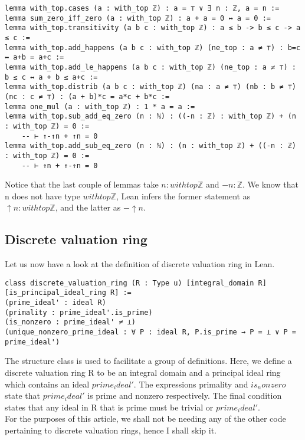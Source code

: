 \documentclass[10pt, a4paper]{article}
\begin{document}
\begin{lstlisting}
lemma with_top.cases (a : with_top ℤ) : a = ⊤ ∨ ∃ n : ℤ, a = n :=
lemma sum_zero_iff_zero (a : with_top ℤ) : a + a = 0 ↔ a = 0 :=
lemma with_top.transitivity (a b c : with_top ℤ) : a ≤ b -> b ≤ c -> a ≤ c :=
lemma with_top.add_happens (a b c : with_top ℤ) (ne_top : a ≠ ⊤) : b=c ↔ a+b = a+c :=
lemma with_top.add_le_happens (a b c : with_top ℤ) (ne_top : a ≠ ⊤) : b ≤ c ↔ a + b ≤ a+c :=
lemma with_top.distrib (a b c : with_top ℤ) (na : a ≠ ⊤) (nb : b ≠ ⊤) (nc : c ≠ ⊤) : (a + b)*c = a*c + b*c :=
lemma one_mul (a : with_top ℤ) : 1 * a = a :=
lemma with_top.sub_add_eq_zero (n : ℕ) : ((-n : ℤ) : with_top ℤ) + (n : with_top ℤ) = 0 :=
    -- ⊢ ↑-↑n + ↑n = 0
lemma with_top.add_sub_eq_zero (n : ℕ) : (n : with_top ℤ) + ((-n : ℤ) : with_top ℤ) = 0 :=
    -- ⊢ ↑n + ↑-↑n = 0
\end{lstlisting}

Notice that the last couple of lemmas take $n : with top \mathbb{Z}$ and $-n : \mathbb{Z}$. We know that n does not have type $with top \mathbb{Z}$, Lean infers the former statement as $\uparrow n : with top \mathbb{Z}$, and the latter as $- \uparrow n$.

\subsection{Discrete valuation ring}
Let us now have a look at the definition of discrete valuation ring in Lean.

\begin{lstlisting}
class discrete_valuation_ring (R : Type u) [integral_domain R] [is_principal_ideal_ring R] :=
(prime_ideal' : ideal R)
(primality : prime_ideal'.is_prime)
(is_nonzero : prime_ideal' ≠ ⊥)
(unique_nonzero_prime_ideal : ∀ P : ideal R, P.is_prime → P = ⊥ ∨ P = prime_ideal')
\end{lstlisting}

The structure class is used to facilitate a group of definitions. Here, we define a discrete valuation ring R to be an integral domain and a principal ideal ring which contains an ideal $prime_ideal'$. The expressions primality and $is_nonzero$ state that $prime_ideal'$ is prime and nonzero respectively. The final condition states that any ideal in R that is prime must be trivial or $prime_ideal'$. \\

For the purposes of this article, we shall not be needing any of the other code pertaining to discrete valuation rings, hence I shall skip it.
\end{document}
